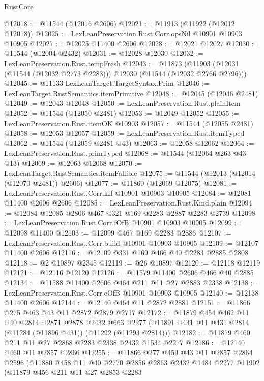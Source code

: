 \begin{lexlean}{RustCore}
\begin{coremodule}
@12018 := @11544 (@12016 @2606)
@12021 := @11913 (@11922 (@12012 @12018))
@12025 := LexLeanPreservation.Rust.Corr.opsNil @10901 @10903 @10905
@12027 := @12025 @11400 @2606
@12028 := @12021 @12027
@12030 := @11544 (@12004 @2432)
@12031 := @12028 @12030
@12032 := LexLeanPreservation.Rust.tempFresh
@12043 := @11873
    (@11903 (@12031 (@11544 (@12032 @2773 @2283))) @12030 (@11544 (@12032 @2766 @2796)))
@12045 := @11133 LexLeanTarget.TargetSyntax.Prim
@12046 := LexLeanTarget.RustSemantics.itemPrimitive
@12048 := @12045 (@12046 @2481)
@12049 := @12043 @12048
@12050 := LexLeanPreservation.Rust.plainItem
@12052 := @11544 (@12050 @2481)
@12053 := @12049 @12052
@12055 := LexLeanPreservation.Rust.itemOK @10903
@12057 := @11544 (@12055 @2481)
@12058 := @12053 @12057
@12059 := LexLeanPreservation.Rust.itemTyped
@12062 := @11544 (@12059 @2481 @43)
@12063 := @12058 @12062
@12064 := LexLeanPreservation.Rust.primTyped
@12068 := @11544 (@12064 @263 @43 @13)
@12069 := @12063 @12068
@12070 := LexLeanTarget.RustSemantics.itemFallible
@12075 := @11544 (@12013 (@12014 (@12070 @2481)) @2606)
@12077 := @11860 (@12069 @12075)
@12081 := LexLeanPreservation.Rust.Corr.kIf @10901 @10903 @10905
@12084 := @12081 @11400 @2606 @2606
@12085 := LexLeanPreservation.Rust.Kind.plain
@12094 := @12084 @12085 @2806 @467 @321 @169 @2283 @2887 @2283 @2739
@12098 := LexLeanPreservation.Rust.Corr.fOfB @10901 @10903 @10905
@12099 := @12098 @11400
@12103 := @12099 @467 @169 @2283 @2886
@12107 := LexLeanPreservation.Rust.Corr.build @10901 @10903 @10905
@12109 := @12107 @11400 @2606
@12116 := @12109 @331 @169 @466 @40 @2283 @2885 @2808
@12118 := @2 @10897 @2345
@12119 := @26 @10897
@12120 := @12118 @12119
@12121 := @12116 @12120
@12126 := @11579 @11400 @2606 @466 @40 @2885
@12134 := @11588 @11400 @2606 @464 @211 @11 @27 @2883 @2338
@12138 := LexLeanPreservation.Rust.Corr.eOfB @10901 @10903 @10905
@12140 := @12138 @11400 @2606
@12144 := @12140 @464 @11 @2872 @2881
@12151 := @11866 @275 @463 @43 @11 @2872 @2879 @2717
@12172 := @11879
    @454
    @462
    @11
    @40
    @2814
    @2871
    @2878
    @2432
    @663
    @2277
    (@11891 @431 @11 @431 @2814 (@11284 (@11896 @431)) (@11292 (@11293 @2814)))
@12182 := @11879 @460 @211 @11 @27 @2868 @2283 @2338 @2432 @1534 @2277
@12186 := @12140 @460 @11 @2857 @2866
@12255 := @11866
    @277
    @459
    @43
    @11
    @2857
    @2864
    @2596
    (@11880
      @458
      @11
      @40
      @2770
      @2856
      @2863
      @2432
      @1484
      @2277
      @11902
      (@11879
        @456
        @211
        @11
        @27
        @2853
        @2283

\end{coremodule}
\end{lexlean}

